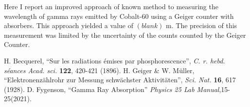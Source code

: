 \documentclass[aps,twocolumn,showpacs,preprintnumbers]{revtex4}
\begin{document}
Here I report an improved approach of known method \cite{Manual} to measuring the wavelength of gamma rays emitted by Cobalt-60 using a Geiger counter with absorbers.
This approach yielded a value of $(blank)$ m.  
The precision of this measurement was limited by the uncertainty of the counts counted by the Geiger Counter.


\begin{thebibliography}{10}










 H. Becquerel, ``Sur les radiations {\'e}mises par phosphorescence'', {\it C. r. hebd. s{\'e}ances Acad. sci.} {\bf 122}, 420-421 (1896).
H. Geiger \& W. M{\"u}ller, ``Elektronenz{\"a}hlrohr zur Messung schw{\"a}chster Aktivit{\"a}ten'', {\it Sci. Nat.} {\bf 16}, 617 (1928). 
D. Fygenson, ``Gamma Ray Absorption'' {\it Physics 25 Lab Manual},15-25(2021). 

\end{thebibliography}
\end{document}
